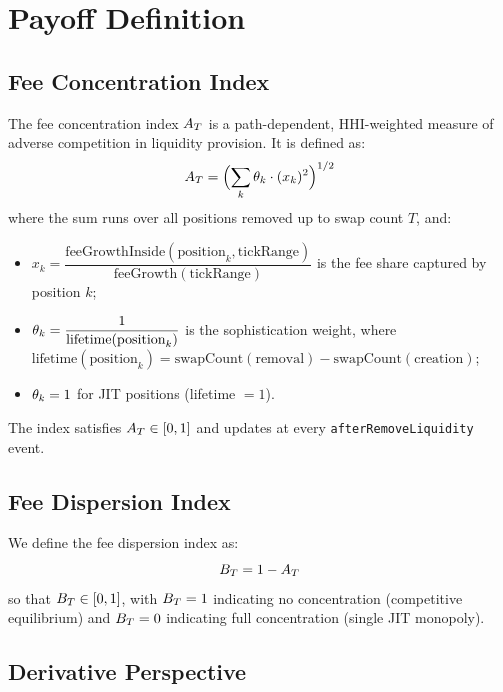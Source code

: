
\section{Payoff Definition}\label{sec:payoff}

\subsection{Fee Concentration Index}

The fee concentration index $A_T$ is a path-dependent, HHI-weighted measure of adverse competition
in liquidity provision. It is defined as:
\begin{equation}\label{eq:concentration-index}
  A_T = \Bigl(\sum_{k} \theta_k \cdot (x_k)^2 \Bigr)^{1/2}
\end{equation}
where the sum runs over all positions removed up to swap count $T$, and:
\begin{itemize}
  \item $x_k = \dfrac{\text{feeGrowthInside}(\text{position}_k, \text{tickRange})}%
                     {\text{feeGrowth}(\text{tickRange})}$
        is the fee share captured by position $k$;
  \item $\theta_k = \dfrac{1}{\text{lifetime}(\text{position}_k)}$
        is the sophistication weight, where
        $\text{lifetime}(\text{position}_k) = \text{swapCount}(\text{removal}) - \text{swapCount}(\text{creation})$;
  \item $\theta_k = 1$ for JIT positions (lifetime $= 1$).
\end{itemize}

The index satisfies $A_T \in [0,1]$ and updates at every \texttt{afterRemoveLiquidity} event.

\subsection{Fee Dispersion Index}

We define the fee dispersion index as:
\begin{equation}\label{eq:dispersion-index}
  B_T = 1 - A_T
\end{equation}
so that $B_T \in [0,1]$, with $B_T = 1$ indicating no concentration (competitive equilibrium)
and $B_T = 0$ indicating full concentration (single JIT monopoly).

\subsection{Derivative Perspective}

